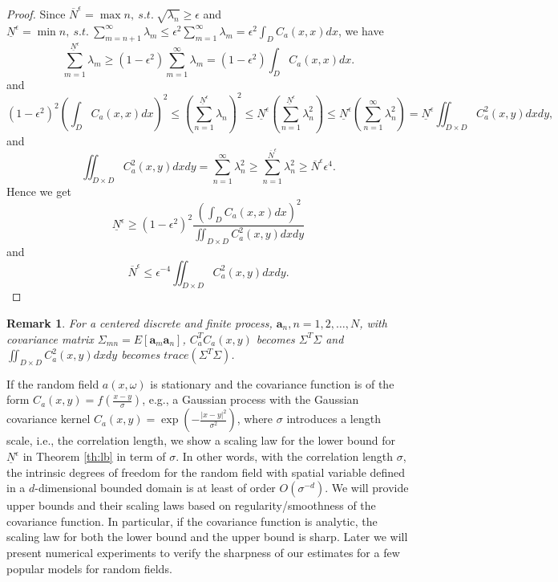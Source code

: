 \documentclass[11pt]{amsart}
\newtheorem{remark}{Remark}[section]
\newcommand{\ba}{\mathbf{a}}
\newcommand{\w}{\omega}
\begin{document}
\begin{proof}

Since $\overline{N}^{\epsilon}=\max  n, ~s.t. ~\sqrt{\lambda_n} \ge \epsilon$ and $ \underline{N}^{\epsilon}=\min n, ~s.t.~ \sum_{m=n+1}^{\infty}\lambda_m \le \epsilon^2 \sum_{m=1}^{\infty}\lambda_m= \epsilon^2\int_D C_a(x,x) dx $, we have
\[
\sum_{m=1}^{ \underline{N}^{\epsilon}}\lambda_m \ge (1- \epsilon^2) \sum_{m=1}^{\infty}\lambda_m= (1-\epsilon^2)\int_D C_a(x,x) dx.
\]
and 
\begin{equation}
\label{eq:CS}
(1-\epsilon^2)^2\left(\int_D C_a(x,x) dx\right)^2\le (\sum_{n=1}^{ \underline{N}^{\epsilon}}\lambda_n )^2\le  \underline{N}^{\epsilon}  (\sum_{n=1}^{\underline{N}^{\epsilon}}\lambda_n^2) \le \underline{N}^{\epsilon}  (\sum_{n=1}^{\infty}\lambda_n^2)=\underline{N}^{\epsilon} \iint_{D\times D} C_a^2(x,y)dxdy,
\end{equation}
and 
\begin{equation}
\label{eq:upper}
\iint_{D\times D} C_a^2(x,y)dxdy = \sum_{n=1}^{\infty}\lambda_n^2 \ge \sum_{n=1}^{\overline{N}^{\epsilon}}\lambda_n^2 \ge \overline{N}^{\epsilon} \epsilon^4.
\end{equation}
Hence we get 
\begin{equation}
\label{eq:lower}
\underline{N}^{\epsilon} \ge (1-\epsilon^2)^2\frac{\left(\int_D C_a(x,x) dx\right)^2}{\iint_{D\times D} C_a^2(x,y)dxdy}
\end{equation}
and 
\begin{equation}
\overline{N}^{\epsilon}\le \epsilon^{-4}\iint_{D\times D} C_a^2(x,y)dxdy.
\end{equation}

\end{proof}

\begin{remark}
For a centered discrete and finite process, $\ba_n, n=1, 2, \ldots, N$, with covariance matrix $\Sigma_{mn}=E[\ba_m\ba_n]$, $C_a^T C_a(x,y)$ becomes $\Sigma^T\Sigma$ and $\iint_{D\times D} C_a^2(x,y)dxdy$ becomes $trace(\Sigma^T\Sigma)$.
\end{remark}

If the random field $a(x,\w)$ is stationary and the covariance function is of the form $C_a (x,y)=f(\frac{x-y}{\sigma})$, 
e.g., a Gaussian process with the Gaussian covariance kernel $C_a(x,y)=\exp(-\frac{|x-y|^2}{\sigma^2})$,
 where $\sigma$ introduces a length scale, 
 i.e., the correlation length, we show a scaling law for the lower bound for $\underline{N}^{\epsilon}$ in Theorem \ref{th:lb} in term of $\sigma$. In other words, with the correlation length $\sigma$, the intrinsic degrees of freedom for the random field with spatial variable defined in a $d$-dimensional bounded domain is at least of order $O(\sigma^{-d})$. We will provide upper bounds and their scaling laws based on regularity/smoothness of the covariance function. In particular, if the covariance function is analytic, the scaling law for both the lower bound and the upper bound is sharp. Later we will  
 present numerical experiments to verify the sharpness of our estimates for a few popular models for random fields. 
\end{document}
